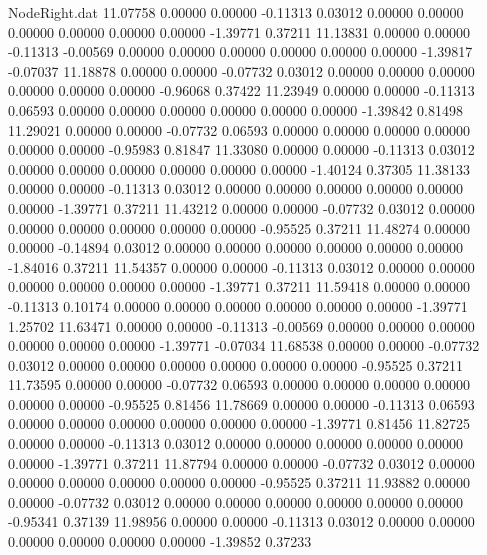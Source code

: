 \begin{filecontents}{NodeRight.dat}
  11.07758    0.00000    0.00000    -0.11313    0.03012    0.00000    0.00000    0.00000    0.00000    0.00000    0.00000   -1.39771    0.37211
  11.13831    0.00000    0.00000    -0.11313   -0.00569    0.00000    0.00000    0.00000    0.00000    0.00000    0.00000   -1.39817   -0.07037
  11.18878    0.00000    0.00000    -0.07732    0.03012    0.00000    0.00000    0.00000    0.00000    0.00000    0.00000   -0.96068    0.37422
  11.23949    0.00000    0.00000    -0.11313    0.06593    0.00000    0.00000    0.00000    0.00000    0.00000    0.00000   -1.39842    0.81498
  11.29021    0.00000    0.00000    -0.07732    0.06593    0.00000    0.00000    0.00000    0.00000    0.00000    0.00000   -0.95983    0.81847
  11.33080    0.00000    0.00000    -0.11313    0.03012    0.00000    0.00000    0.00000    0.00000    0.00000    0.00000   -1.40124    0.37305
  11.38133    0.00000    0.00000    -0.11313    0.03012    0.00000    0.00000    0.00000    0.00000    0.00000    0.00000   -1.39771    0.37211
  11.43212    0.00000    0.00000    -0.07732    0.03012    0.00000    0.00000    0.00000    0.00000    0.00000    0.00000   -0.95525    0.37211
  11.48274    0.00000    0.00000    -0.14894    0.03012    0.00000    0.00000    0.00000    0.00000    0.00000    0.00000   -1.84016    0.37211
  11.54357    0.00000    0.00000    -0.11313    0.03012    0.00000    0.00000    0.00000    0.00000    0.00000    0.00000   -1.39771    0.37211
  11.59418    0.00000    0.00000    -0.11313    0.10174    0.00000    0.00000    0.00000    0.00000    0.00000    0.00000   -1.39771    1.25702
  11.63471    0.00000    0.00000    -0.11313   -0.00569    0.00000    0.00000    0.00000    0.00000    0.00000    0.00000   -1.39771   -0.07034
  11.68538    0.00000    0.00000    -0.07732    0.03012    0.00000    0.00000    0.00000    0.00000    0.00000    0.00000   -0.95525    0.37211
  11.73595    0.00000    0.00000    -0.07732    0.06593    0.00000    0.00000    0.00000    0.00000    0.00000    0.00000   -0.95525    0.81456
  11.78669    0.00000    0.00000    -0.11313    0.06593    0.00000    0.00000    0.00000    0.00000    0.00000    0.00000   -1.39771    0.81456
  11.82725    0.00000    0.00000    -0.11313    0.03012    0.00000    0.00000    0.00000    0.00000    0.00000    0.00000   -1.39771    0.37211
  11.87794    0.00000    0.00000    -0.07732    0.03012    0.00000    0.00000    0.00000    0.00000    0.00000    0.00000   -0.95525    0.37211
  11.93882    0.00000    0.00000    -0.07732    0.03012    0.00000    0.00000    0.00000    0.00000    0.00000    0.00000   -0.95341    0.37139
  11.98956    0.00000    0.00000    -0.11313    0.03012    0.00000    0.00000    0.00000    0.00000    0.00000    0.00000   -1.39852    0.37233

\end{filecontents}
